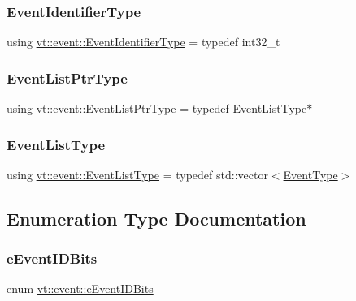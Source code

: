 \subsubsection{\texorpdfstring{Event\+Identifier\+Type}{EventIdentifierType}}
{\footnotesize\ttfamily using \hyperlink{namespacevt_1_1event_a0893245b7a220f3fe6951382e3038afa}{vt\+::event\+::\+Event\+Identifier\+Type} = typedef int32\+\_\+t}

\mbox{\label{namespacevt_1_1event_aa507caad8ea8ee959ccef2d57753dceb}} 
\subsubsection{\texorpdfstring{Event\+List\+Ptr\+Type}{EventListPtrType}}
{\footnotesize\ttfamily using \hyperlink{namespacevt_1_1event_aa507caad8ea8ee959ccef2d57753dceb}{vt\+::event\+::\+Event\+List\+Ptr\+Type} = typedef \hyperlink{namespacevt_1_1event_a7b4d125173ad6453b505d06927581933}{Event\+List\+Type}$\ast$}

\mbox{\label{namespacevt_1_1event_a7b4d125173ad6453b505d06927581933}} 
\subsubsection{\texorpdfstring{Event\+List\+Type}{EventListType}}
{\footnotesize\ttfamily using \hyperlink{namespacevt_1_1event_a7b4d125173ad6453b505d06927581933}{vt\+::event\+::\+Event\+List\+Type} = typedef std\+::vector$<$\hyperlink{namespacevt_a009267401def7ae8bf201892222d060f}{Event\+Type}$>$}



\subsection{Enumeration Type Documentation}
\mbox{\label{namespacevt_1_1event_ad563011dc9e3e01042df27d00092aceb}} 
\subsubsection{\texorpdfstring{e\+Event\+I\+D\+Bits}{eEventIDBits}}
{\footnotesize\ttfamily enum \hyperlink{namespacevt_1_1event_ad563011dc9e3e01042df27d00092aceb}{vt\+::event\+::e\+Event\+I\+D\+Bits}}


